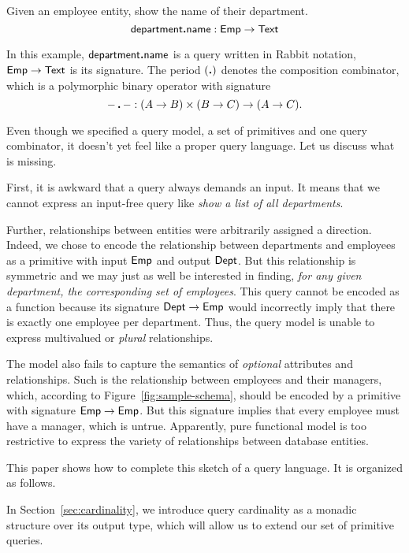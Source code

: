 \begin{example}
    Given an employee entity, show the name of their department.
    \begin{equation*}
        \textup{\textsf{department}}\boldsymbol{.}\textup{\textsf{name}}: \textup{\textsf{Emp}} \to \textup{\textsf{Text}}
    \end{equation*}
\end{example}

In this example, $\textup{\textsf{department}}\boldsymbol{.}\textup{\textsf{name}}$ is a query written in Rabbit notation,
$\textup{\textsf{Emp}} \to \textup{\textsf{Text}}$ is its signature.  The period $(\boldsymbol{.})$ denotes the composition
combinator, which is a polymorphic binary operator with signature
\begin{equation*}
        -\,\boldsymbol{.}\,- : (A \to B) \times (B \to C) \to (A \to C).
\end{equation*}

Even though we specified a query model, a set of primitives and one query
combinator, it doesn't yet feel like a proper query language.  Let us discuss
what is missing.

First, it is awkward that a query always demands an input.  It means that we
cannot express an input-free query like \emph{show a list of all departments}.

Further, relationships between entities were arbitrarily assigned a direction.
Indeed, we chose to encode the relationship between departments and employees
as a primitive with input $\textup{\textsf{Emp}}$ and output $\textup{\textsf{Dept}}$.  But this relationship is
symmetric and we may just as well be interested in finding, \emph{for any given
department, the corresponding set of employees}.  This query cannot be encoded
as a function because its signature $\textup{\textsf{Dept}} \to \textup{\textsf{Emp}}$ would incorrectly imply
that there is exactly one employee per department.  Thus, the query model
is unable to express multivalued or \emph{plural} relationships.

The model also fails to capture the semantics of \emph{optional} attributes and
relationships.  Such is the relationship between employees and their managers,
which, according to Figure~\ref{fig:sample-schema}, should be encoded by a
primitive with signature $\textup{\textsf{Emp}} \to \textup{\textsf{Emp}}$.  But this signature implies that
every employee must have a manager, which is untrue.  Apparently, pure
functional model is too restrictive to express the variety of relationships
between database entities.

This paper shows how to complete this sketch of a query language.  It is
organized as follows.

In Section~\ref{sec:cardinality}, we introduce query cardinality as a mo\-nadic
structure over its output type, which will allow us to extend our set of
primitive queries.

